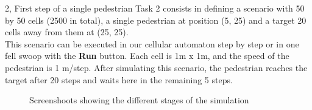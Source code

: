 \documentclass[10pt,a4paper]{article}
\begin{document}
\pagebreak

\begin{task}{2, First step of a single pedestrian}
Task 2 consists in defining a scenario with 50 by 50 cells (2500 in total), a single pedestrian at position (5, 25) and a target 20 cells away from them at (25, 25). \\
This scenario can be executed in our cellular automaton step by step or in one fell swoop with the \textbf{Run} button. Each cell is 1m x 1m, and the speed of the pedestrian is 1 m/step. After simulating this scenario, the pedestrian reaches the target after 20 steps and waits here in the remaining 5 steps.

\begin{figure} [!h]
 \centering
 \caption{Screenshoots showing the different stages of the simulation}
 \label{f}
\end{figure}

\end{task}

\pagebreak
\end{document}
